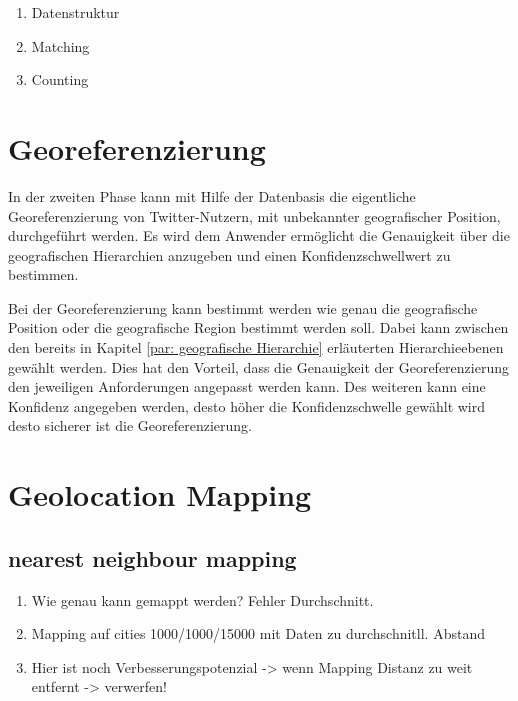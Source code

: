 	\begin{enumerate}
		\item Datenstruktur
		\item Matching
		\item Counting  
	\end{enumerate}

	\section{Georeferenzierung}   
	In der zweiten Phase kann mit Hilfe der Datenbasis die eigentliche Georeferenzierung von Twitter-Nutzern, mit unbekannter geografischer Position, durchgeführt werden. 
	Es wird dem Anwender ermöglicht die Genauigkeit über die geografischen Hierarchien anzugeben und einen Konfidenzschwellwert zu bestimmen.

	Bei der Georeferenzierung kann bestimmt werden wie genau die geografische Position oder die geografische Region bestimmt werden soll. 
	Dabei kann zwischen den bereits in Kapitel \ref{par: geografische Hierarchie} erläuterten Hierarchieebenen gewählt werden.
	Dies hat den Vorteil, dass die Genauigkeit der Georeferenzierung den jeweiligen Anforderungen angepasst werden kann.
	Des weiteren kann eine Konfidenz angegeben werden, desto höher die Konfidenzschwelle gewählt wird desto sicherer ist die Georeferenzierung. 
	
	


\section{Geolocation Mapping}

	\subsection{nearest neighbour mapping}
		\begin{enumerate}
			\item {} Wie genau kann gemappt werden? Fehler Durchschnitt. 
			\item Mapping auf cities 1000/1000/15000 mit Daten zu durchschnitll. Abstand
			\item Hier ist noch Verbesserungspotenzial -> wenn Mapping Distanz zu weit entfernt -> verwerfen! 
		\end{enumerate} 

